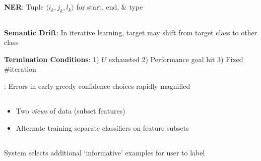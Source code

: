 \documentclass[8pt]{extarticle}
\renewcommand{\green}[1]{{\color{ForestGreen} #1}}
\newcommand{\greenbf}[1]{\textbf{\green{#1}}}
\newcommand{\redbf}[1]{\textbf{\red{#1}}}
\begin{document}
\begin{multicols}{3}
  \subsection*{}

  \greenbf{NER}: Tuple ${\langle i_k, j_k, l_k \rangle}$ for start, end, \& type

  \subsection*{}

  \greenbf{Semantic Drift}: In iterative learning, target may shift from target class to other class

  \textbf{Termination Conditions}: 1) $U$ exhausted 2) Performance goal hit 3) Fixed \#iteration

  \redbf{Problem}: Errors in early greedy confidence choices rapidly magnified

  \subsection*{}
  \begin{itemize}
    \item Two \textit{views} of data (subset features)
    \item Alternate training separate classifiers on feature subsets
  \end{itemize}

  \subsection*{}
  System selects additional ‘informative’ examples for user to label

\end{multicols}
\end{document}
